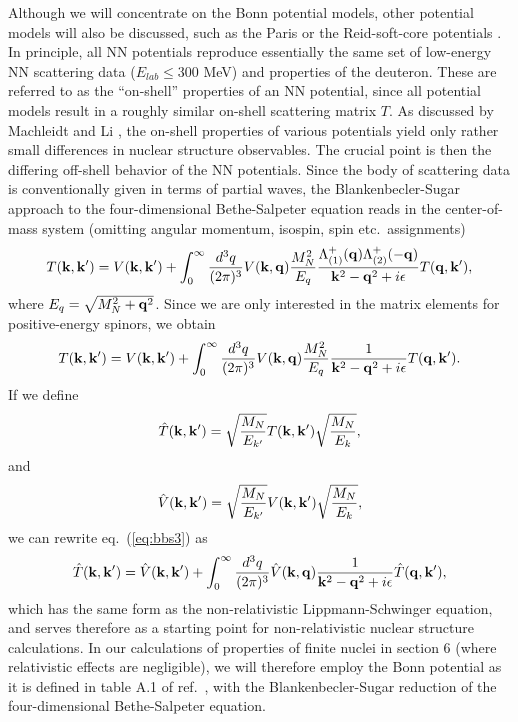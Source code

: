 Although we will concentrate on the Bonn 
potential models, other potential models
will also be discussed, such as the Paris 
\cite{paris80} or the Reid-soft-core potentials \cite{reid68}. In principle, all
NN potentials
reproduce essentially the same set of low-energy NN scattering data
($E_{lab} \leq 300$ MeV) and properties of the deuteron.
These are referred to as the
``on-shell'' properties of an NN potential, since all potential
models result in a roughly
similar on-shell scattering matrix $T$.
As discussed by Machleidt and Li \cite{mac93}, the on-shell properties of
various potentials yield only rather small differences in nuclear structure
observables. The crucial point is
then the differing off-shell behavior of the
NN potentials.
Since the body of scattering data is conventionally
given in terms of partial waves, the Blankenbecler-Sugar
approach to the four-dimensional
Bethe-Salpeter equation reads in the center-of-mass  system (omitting
angular momentum, isospin, spin etc.\ assignments)
\begin{equation}
   T({\bf k}, {\bf k}')=V({\bf k}, {\bf k}')
   +\int_{0}^{\infty} \frac{d^3 q}{(2\pi )^3}
     V({\bf k}, {\bf q})\frac{M_N^2}{E_q}
     \frac{\Lambda_{(1)}^+ ({\bf q})\Lambda_{(2)}^+ ({\bf -q})}
     {{\bf k}^2-{\bf q}^2 +i\epsilon}T({\bf q}, {\bf k}'),
\end{equation}
where $E_q=\sqrt{M_N^2+{\bf q}^2}$.
Since we are only interested in the matrix elements for positive-energy
spinors, we obtain
\begin{equation}
   T({\bf k}, {\bf k}')=V({\bf k}, {\bf k}')
   +\int_{0}^{\infty} \frac{d^3 q}{(2\pi )^3}
     V({\bf k}, {\bf q})\frac{M_N^2}{E_q}
     \frac{1}
     {{\bf k}^2-{\bf q}^2 +i\epsilon}T({\bf q}, {\bf k}').
    \label{eq:bbs3}
\end{equation}
If we define
\begin{equation}
   \hat{T}({\bf k}, {\bf k}')=
   \sqrt{\frac{M_N}{E_{k'}}}T({\bf k}, {\bf k}')\sqrt{\frac{M_N}{E_{k}}},
\end{equation}
and
\begin{equation}
    \hat{V}({\bf k}, {\bf k}')=
    \sqrt{\frac{M_N}{E_{k'}}}V({\bf k}, {\bf k}')\sqrt{\frac{M_N}{E_{k}}},
\end{equation}
we can rewrite eq.\ (\ref{eq:bbs3}) as
\begin{equation}
  \hat{ T}({\bf k}, {\bf k}')=\hat{V}({\bf k}, {\bf k}')
   +\int_{0}^{\infty} \frac{d^3 q}{(2\pi )^3}
     \hat{V}({\bf k}, {\bf q})
     \frac{1}
     {{\bf k}^2-{\bf q}^2 +i\epsilon}\hat{T}({\bf q}, {\bf k}'),
   \label{eq:bbs2}
\end{equation}
which has the same form as the non-relativistic Lippmann-Schwinger
equation, and serves therefore as a starting point for non-relativistic
nuclear structure calculations. In our calculations of properties
of finite nuclei in section 6 (where relativistic effects
are negligible), we will therefore employ the Bonn potential
as it is defined in table A.1 of ref.\ \cite{mac89},
with the Blankenbecler-Sugar
reduction of the four-dimensional Bethe-Salpeter equation.

